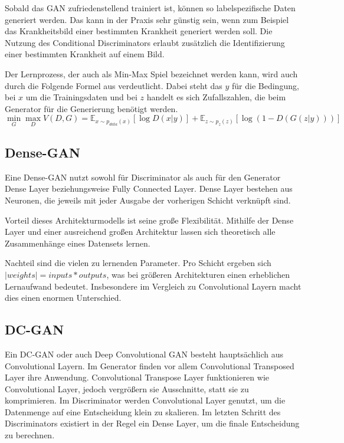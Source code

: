 Sobald das \acrshort{GAN} zufriedenstellend trainiert ist, können so labelspezifische Daten generiert werden.
Das kann in der Praxis sehr günstig sein, wenn zum Beispiel das Krankheitsbild einer bestimmten Krankheit generiert werden soll.
Die Nutzung des Conditional Discriminators erlaubt zusätzlich die Identifizierung einer bestimmten Krankheit auf einem Bild.
\newline

Der Lernprozess, der auch als Min-Max Spiel bezeichnet werden kann, wird auch durch die Folgende Formel aus \cite[S. 3]{mirza2014conditional} verdeutlicht.
Dabei steht das $y$ für die Bedingung, bei $x$ um die Trainingsdaten und bei $z$ handelt es sich Zufallszahlen, die beim Generator für die Generierung benötigt werden.
\begin{equation}
	\min_G \max_D V(D, G) = \mathbb{E}_{x \sim p_{data}(x)} [\log D(x|y)] + \mathbb{E}_{z \sim p_z(z)} [\log(1 - D(G(z|y)))]
\end{equation}

\subsection{Dense-GAN}
Eine Dense-GAN nutzt sowohl für Discriminator als auch für den Generator Dense Layer beziehungsweise Fully Connected Layer.
Dense Layer bestehen aus Neuronen, die jeweils mit jeder Ausgabe der vorherigen Schicht verknüpft sind.
\newline

Vorteil dieses Architekturmodells ist seine große Flexibilität.
Mithilfe der Dense Layer und einer ausreichend großen Architektur lassen sich theoretisch alle Zusammenhänge eines Datensets lernen.
\newline

Nachteil sind die vielen zu lernenden Parameter.
Pro Schicht ergeben sich $|weights| = inputs * outputs$, was bei größeren Architekturen einen erheblichen Lernaufwand bedeutet.
Insbesondere im Vergleich zu Convolutional Layern macht dies einen enormen Unterschied.

\subsection{DC-GAN}
Ein DC-GAN oder auch Deep Convolutional GAN besteht hauptsächlich aus Convolutional Layern.
Im Generator finden vor allem Convolutional Transposed Layer ihre Anwendung.
Convolutional Transpose Layer funktionieren wie Convolutional Layer, jedoch vergrößern sie Ausschnitte, statt sie zu komprimieren.
Im Discriminator werden Convolutional Layer genutzt, um die Datenmenge auf eine Entscheidung klein zu skalieren.
Im letzten Schritt des Discriminators existiert in der Regel ein Dense Layer, um die finale Entscheidung zu berechnen.
\newline


